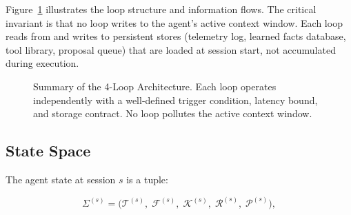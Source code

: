 \documentclass[11pt]{article}
\begin{document}
Figure~\ref{fig:architecture} illustrates the loop structure and information
flows. The critical invariant is that no loop writes to the agent's active
context window. Each loop reads from and writes to persistent stores (telemetry
log, learned facts database, tool library, proposal queue) that are loaded at
session start, not accumulated during execution.

\begin{figure}[H]
\centering
{}
\caption{Summary of the 4-Loop Architecture. Each loop operates independently
with a well-defined trigger condition, latency bound, and storage contract.
No loop pollutes the active context window.}
\label{fig:architecture}
\end{figure}

\subsection{State Space}

The agent state at session $s$ is a tuple:

\begin{equation}
\label{eq:state}
\Sigma^{(s)} = \bigl( \mathcal{T}^{(s)},\; \mathcal{F}^{(s)},\; \mathcal{K}^{(s)},\;
               \mathcal{R}^{(s)},\; \mathcal{P}^{(s)} \bigr),
\end{equation}
\end{document}
